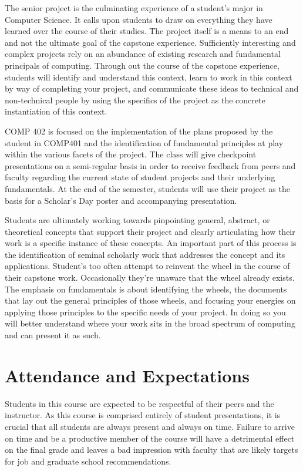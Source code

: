 \documentclass[10pt]{article}
\begin{document}
The senior project is the culminating experience of a student's major in Computer Science.  It calls upon students to draw on everything they have learned over the course of their studies. The project itself is a means to an end and not the ultimate goal of the capstone experience. Sufficiently interesting and complex projects rely on an abundance of existing research and fundamental principals of computing.  Through out the course of the capstone experience, students will identify and understand this context, learn to work in this context by way of completing your project, and communicate these ideas to technical and non-technical people by using the specifics of the project as the concrete instantiation of this context. 

COMP 402 is focused on the implementation of the plans proposed by the student in COMP401 and the identification of fundamental principles at play within the various facets of the project. The class will give checkpoint presentations on a semi-regular basis in order to receive feedback from peers and faculty regarding the current state of student projects and their underlying fundamentals.   At the end of the semester, students will use their project as the basis for a Scholar's Day poster and accompanying presentation.

Students are ultimately working towards pinpointing general, abstract, or theoretical concepts that support their project and clearly articulating how their work is a specific instance of these concepts. An important part of this process is the identification of seminal scholarly work that addresses the concept and its applications. Student's too often attempt to reinvent the wheel in the course of their capstone work. Occasionally they're unaware that the wheel already exists. The emphasis on fundamentals is about identifying the wheels, the documents that lay out the general principles of those wheels, and focusing your energies on applying those principles to the specific needs of your project. In doing so you will better understand where your work sits in the broad spectrum of computing and can present it as such. 


\section{Attendance and Expectations}

Students in this course are expected to be respectful of their peers and the instructor. As this course is comprised entirely of student presentations, it is crucial that all students are always present and always on time.  Failure to arrive on time and be a productive member of the course will have a detrimental effect on the final grade and leaves a bad impression with faculty that are likely targets for job and graduate school recommendations.
\end{document}
